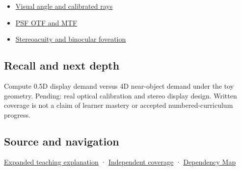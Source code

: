 \hypertarget{appendix-f90cee1be7a4-used-by}{}

\begin{itemize}
\tightlist
\item
  \hyperref[appendix-7d356c396d1a]{Visual angle and calibrated rays}
\item
  \hyperref[appendix-8b76b0efd27f]{PSF OTF and MTF}
\item
  \hyperref[appendix-8dc848f14052]{Stereoacuity and binocular foveation}
\end{itemize}

\subsection{Recall and next depth}\label{appendix-f90cee1be7a4-recall-and-next-depth}

\hypertarget{appendix-f90cee1be7a4-recall-and-next-depth}{}

Compute 0.5D display demand versus 4D near-object demand under the toy geometry. Pending: real optical calibration and stereo display design. Written coverage is not a claim of learner mastery or accepted numbered-curriculum progress.

\subsection{Source and navigation}\label{appendix-f90cee1be7a4-source-and-navigation}

\hypertarget{appendix-f90cee1be7a4-source-and-navigation}{}

\hyperref[04-visual-computing-ii-ch042-focus-and-stereo-can-disagree-even-when-the-images-are-sharp]{Expanded teaching explanation} · \hyperref[appendix-fd090d982a15-xr01---independent-seeing-and-representation-source]{Independent coverage} · \hyperref[appendix-4ad47bdd269a]{Dependency Map}
